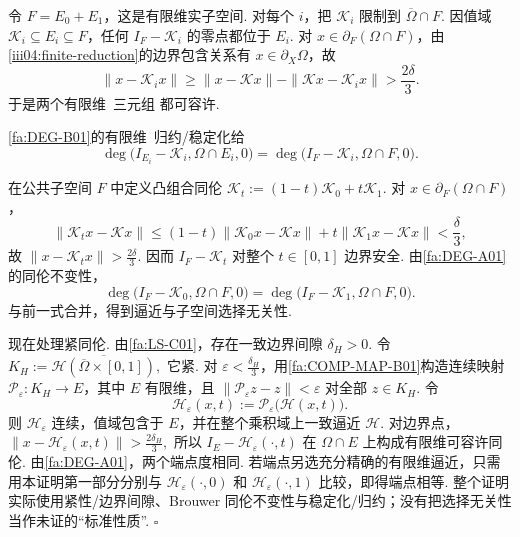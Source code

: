\begin{FAProof}
令 \(\displaystyle F=E_0+E_1\)，这是有限维实子空间. 对每个 \(\displaystyle i\)，把 \(\displaystyle\mathcal K_i\) 限制到 \(\displaystyle\overline\Omega\cap F\). 因值域 \(\displaystyle\mathcal K_i\subseteq E_i\subseteq F\)，任何 \(\displaystyle I_F-\mathcal K_i\) 的零点都位于 \(\displaystyle E_i\). 对 \(\displaystyle x\in\partial_F(\Omega\cap F)\)，由\autoref{iii04:finite-reduction}的边界包含关系有 \(\displaystyle x\in\partial_X\Omega\)，故
\[
\|x-\mathcal K_i x\|
\geqslant
\|x-\mathcal Kx\|-
\|\mathcal Kx-\mathcal K_i x\|
>
\frac{2\delta}{3}.
\]
于是两个有限维\allowbreak\ 三元组 都可容许.\par\noindent\autoref{fa:DEG-B01}的有限维\allowbreak\ 归约/稳定化给
\[
\deg\bigl(I_{E_i}-\mathcal K_i,\Omega\cap E_i,0\bigr)
=
\deg\bigl(I_F-\mathcal K_i,\Omega\cap F,0\bigr).
\]

在公共子空间 \(\displaystyle F\) 中定义凸组合同伦
\(\displaystyle \mathcal K_t :=(1-t)\mathcal K_0+t\mathcal K_1.\)
对 \(\displaystyle x\in\partial_F(\Omega\cap F)\)，
\[
\|\mathcal K_t x-\mathcal Kx\|
\leqslant
(1-t)\|\mathcal K_0x-\mathcal Kx\|
+t\|\mathcal K_1x-\mathcal Kx\|
<
\frac{\delta}{3},
\]
故 \(\displaystyle\|x-\mathcal K_t x\|>\frac{2\delta}{3}\). 因而 \(\displaystyle I_F-\mathcal K_t\) 对整个 \(\displaystyle t\in[0,1]\) 边界安全. 由\autoref{fa:DEG-A01}的同伦不变性，
\[
\deg\bigl(I_F-\mathcal K_0,\Omega\cap F,0\bigr)
=
\deg\bigl(I_F-\mathcal K_1,\Omega\cap F,0\bigr).
\]
与前一式合并，得到逼近与子空间选择无关性.

现在处理紧同伦. 由\autoref{fa:LS-C01}，存在一致边界间隙 \(\displaystyle\delta_H>0\). 令
\(\displaystyle K_H := \overline{\mathcal H(\overline\Omega\times[0,1])},\)
它紧. 对 \(\displaystyle\varepsilon<\frac{\delta_H}{3}\)，用\autoref{fa:COMP-MAP-B01}构造连续映射 \(\displaystyle\mathcal P_{\varepsilon}:K_H\to E\)，其中 \(\displaystyle E\) 有限维，且 \(\displaystyle\|\mathcal P_{\varepsilon}z-z\|<\varepsilon\) 对全部 \(\displaystyle z\in K_H\). 令
\[
\mathcal H_{\varepsilon}(x,t)
:=
\mathcal P_{\varepsilon}\bigl(\mathcal H(x,t)\bigr).
\]
则 \(\displaystyle\mathcal H_{\varepsilon}\) 连续，值域包含于 \(\displaystyle E\)，并在整个乘积域上一致逼近 \(\displaystyle\mathcal H\). 对边界点，
\(\displaystyle \|x-\mathcal H_{\varepsilon}(x,t)\| > \frac{2\delta_H}{3},\)
所以 \(\displaystyle I_E-\mathcal H_{\varepsilon}(\cdot,t)\) 在 \(\displaystyle\Omega\cap E\) 上构成有限维可容许同伦. 由\autoref{fa:DEG-A01}，两个端点度相同. 若端点另选充分精确的有限维逼近，只需用本证明第一部分分别与 \(\displaystyle\mathcal H_{\varepsilon}(\cdot,0)\) 和 \(\displaystyle\mathcal H_{\varepsilon}(\cdot,1)\) 比较，即得端点相等. 整个证明实际使用紧性/边界间隙、Brouwer 同伦不变性与稳定化/归约；没有把选择无关性当作未证的“标准性质”. \hfill\(\square\)
\end{FAProof}

